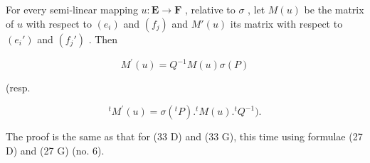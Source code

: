 For every semi-linear mapping \(u: \mathbf{E} \to \mathbf{F}\) , relative to \(\sigma\) , let \(M(u)\) be the matrix of \(u\) with respect to \((e_i)\) and \((f_j)\) and \(M'(u)\) its matrix with respect to \((e_i')\) and \((f_j')\) . Then

\[
M ^ {\prime} (u) = Q ^ {- 1} M (u) \sigma (P)\tag{39 D}
\]

(resp.

\[
{ } ^ { t } M ^ { \prime } ( u ) = \sigma ( { } ^ { t } P ) . { } ^ { t } M ( u ) . { } ^ { t } Q ^ { - 1 } ) .\tag{39 G}
\]

The proof is the same as that for (33 D) and (33 G), this time using formulae (27 D) and (27 G) (no. 6).


